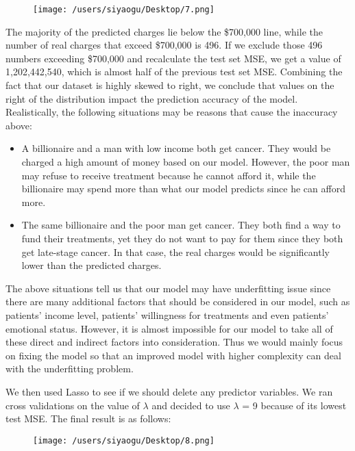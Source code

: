 \documentclass[journal, a4paper,11pt]{IEEEtran}
\begin{document}
	\begin{figure}[ht]
	\centering
	\texttt{[image: /users/siyaogu/Desktop/7.png]}
	\end{figure}

	The majority of the predicted charges lie below the \$700,000 line, while the number of real charges that exceed \$700,000 is 496. If we exclude those 496 numbers exceeding \$700,000 and recalculate the test set MSE, we get a value of 1,202,442,540, which is almost half of the previous test set MSE. Combining the fact that our dataset is highly skewed to right, we conclude that values on the right of the distribution impact the prediction accuracy of the model. Realistically, the following situations may be reasons that cause the inaccuracy above:
	
	\begin{itemize}
     	\item A billionaire and a man with low income both get cancer. They would be charged a high amount of money based on our model. However, the poor man may refuse to receive treatment because he cannot afford it, while the billionaire may spend more than what our model predicts since he can afford more.
   	\item The same billionaire and the poor man get cancer. They both find a way to fund their treatments, yet they do not want to pay for them since they both get late-stage cancer. In that case, the real charges would be significantly lower than the predicted charges.
   	\end{itemize}

	The above situations tell us that our model may have underfitting issue since there are many additional factors that should be considered in our model, such as patients' income level, patients' willingness for treatments and even patients' emotional status. However, it is almost impossible for our model to take all of these direct and indirect factors into consideration. Thus we would mainly focus on fixing the model so that an improved model with higher complexity can deal with the underfitting problem.

	We then used Lasso to see if we should delete any predictor variables. We ran cross validations on the value of $\lambda$ and decided to use $\lambda$ = 9 because of its lowest test MSE. The final result is as follows:
	
	\bigbreak
	\bigbreak\bigbreak
	\bigbreak
	\bigbreak
	\bigbreak
	\bigbreak
	
	\begin{figure}[ht]
	\centering
	\texttt{[image: /users/siyaogu/Desktop/8.png]}
	\end{figure}
	
\end{document}
